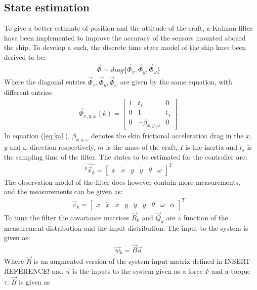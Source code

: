 \documentclass{ifacconf}
\begin{document}
\subsection{State estimation}
To give a better estimate of position and the attitude of the craft, a Kalman filter have been implemented to improve the accuracy of the sensors mounted aboard the ship. To develop a such, the discrete time state model of the ship have been derived to be:
\begin{align}
\vec{\Phi} = diag\{\vec{\Phi} _x,\vec{\Phi} _y,\vec{\Phi} _\omega\}
\end{align}
Where the diagonal entries $\vec{\Phi} _x,\vec{\Phi} _y,\vec{\Phi} _\omega$ are given by the same equation, with different entries:
\begin{align}
\vec{\Phi}_{x,y,\omega}(k) = \begin{bmatrix}
1 & t_s & 0\\
0 & 1 & t_s\\
0 & -\beta_{x,y,\omega} & 0
\end{bmatrix}
\label{eq:kal}
\end{align}
In equation (\ref{eq:kal}), $\beta_{x,y,\omega}$ denotes the skin frictional acceleration drag in the $x$,$y$ and $\omega$ direction respectively, $m$ is the mass of the craft, $I$ is the inertia and $t_s$ is the sampling time of the filter. The states to be estimated for the controller are:
\begin{align}
^b\hat{\vec{x}_k} = \begin{bmatrix}
x & \dot{x} & y & \dot{y} & \theta & \omega
\end{bmatrix}^T
\end{align}
The observation model of the filter does however contain more measurements, and the measurements can be given as:
\begin{align}
\vec{v}_k = \begin{bmatrix}
x & \dot{x} & \ddot{x} & y & \dot{y} & \ddot{y} & \theta & \omega & \alpha
\end{bmatrix}^T
\end{align}
To tune the filter the covariance matrices $\vec{R}_k$ and $\vec{Q}_k$ are a function of the measurement distribution and the input distribution. The input to the system is given as:
\begin{align}
\vec{w}_k = \vec{B}\vec{u}
\end{align}
Where $\vec{B}$ is an augmented version of the system input matrix defined in INSERT REFERENCE! and $\vec{u}$ is the inputs to the system given as a force $F$ and a torque $\tau$. $\vec{B}$ is given as 
\end{document}
